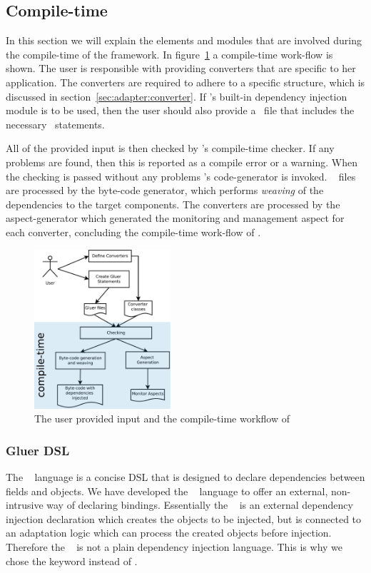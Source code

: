 \subsection{Compile-time}
\label{sec:adapter:compile}

In this section we will explain the elements and modules that are involved during the compile-time of the framework. In figure~\ref{fig:ctwf} a compile-time work-flow is shown. The user is responsible with providing converters that are specific to her application. The converters are required to adhere to a specific structure, which is discussed in section~\ref{sec:adapter:converter}. 
If \zamk's built-in dependency injection module is to be used, then the user should also provide a \gluer~file that includes the necessary \gluer~statements. 

All of the provided input is then checked by \zamk's compile-time checker. If any problems are found, then this is reported as a compile error or a warning. When the checking is passed without any problems \zamk's code-generator is invoked. \gluer~ files are processed by the byte-code generator, which performs \emph{weaving} of the dependencies to the target components. The converters are processed by the aspect-generator which generated the monitoring and management aspect for each converter, concluding the compile-time work-flow of \zamk.
\begin{figure}
\centering
\includegraphics[width=0.45\textwidth]{chapteradapters/ctv.pdf}
\caption{The user provided input and the compile-time workflow of \zamk}
\label{fig:ctwf}
\end{figure}

\subsubsection{Gluer DSL}
The \gluer~ language is a concise DSL that is designed to declare dependencies between fields and objects. 
We have developed the \gluer~ language to offer an external, non-intrusive way of declaring bindings. 
Essentially the \gluer~ is an external dependency injection declaration which creates the objects to be injected, but is connected to an adaptation logic which can process the created objects before injection.
Therefore the \gluer~ is not a plain dependency injection language. 
This is why we chose the keyword  instead of . 

